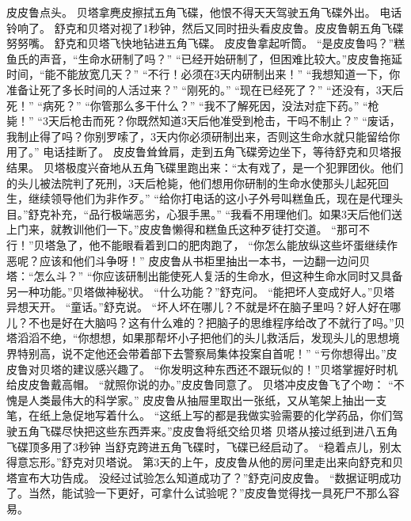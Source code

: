 \documentclass[a4paper,12pt,UTF8,twoside]{ctexbook}
\begin{document}
        皮皮鲁点头。 
        贝塔拿麂皮擦拭五角飞碟，他恨不得天天驾驶五角飞碟外出。 
        电话铃响了。 
        舒克和贝塔对视了1秒钟，然后又同时扭头看皮皮鲁。皮皮鲁朝五角飞碟努努嘴。 
        舒克和贝塔飞快地钻进五角飞碟。 
        皮皮鲁拿起听筒。 
        “是皮皮鲁吗？”糕鱼氏的声音，“生命水研制了吗？” 
        “已经开始研制了，但困难比较大。”皮皮鲁拖延时间，“能不能放宽几天？” 
        “不行！必须在3天内研制出来！” 
        “我想知道一下，你准备让死了多长时间的人活过来？” 
        “刚死的。” 
        “现在已经死了？” 
        “还没有，3天后死！” 
        “病死？” 
        “你管那么多干什么？” 
        “我不了解死因，没法对症下药。” 
        “枪毙！” 
        “3天后枪击而死？你既然知道3天后他准受到枪击，干吗不制止？” 
        “废话，我制止得了吗？你别罗嗦了，3天内你必须研制出来，否则这生命水就只能留给你用了。” 
        电话挂断了。 
        皮皮鲁耸耸肩，走到五角飞碟旁边坐下，等待舒克和贝塔报结果。 
        贝塔极度兴奋地从五角飞碟里跑出来：“太有戏了，是一个犯罪团伙。他们的头儿被法院判了死刑，3天后枪毙，他们想用你研制的生命水使那头儿起死回生，继续领导他们为非作歹。” 
        “给你打电话的这小子外号叫糕鱼氏，现在是代理头目。”舒克补充，“品行极端恶劣，心狠手黑。” 
        “我看不用理他们。如果3天后他们送上门来，就教训他们一下。”皮皮鲁懒得和糕鱼氏这种歹徒打交道。 
        “那可不行！”贝塔急了，他不能眼看着到口的肥肉跑了，  “你怎么能放纵这些坏蛋继续作恶呢？应该和他们斗争呀！” 
        皮皮鲁从书柜里抽出一本书，一边翻一边问贝塔：“怎么斗？” 
        “你应该研制出能使死人复活的生命水，但这种生命水同时又具备另一种功能。”贝塔做神秘状。 
        “什么功能？”舒克问。 
        “能把坏人变成好人。”贝塔异想天开。 
        “童话。”舒克说。 
        “坏人坏在哪儿？不就是坏在脑子里吗？好人好在哪儿？不也是好在大脑吗？这有什么难的？把脑子的思维程序给改了不就行了吗。”贝塔滔滔不绝，“你想想，如果那帮坏小子把他们的头儿救活后，发现头儿的思想境界特别高，说不定他还会带着部下去警察局集体投案自首呢！” 
        “亏你想得出。”皮皮鲁对贝塔的建议感兴趣了。 
        “你发明这种东西还不跟玩似的！”贝塔掌握好时机给皮皮鲁戴高帽。 
        “就照你说的办。”皮皮鲁同意了。 
        贝塔冲皮皮鲁飞了个吻： 
        “不愧是人类最伟大的科学家。” 
        皮皮鲁从抽屉里取出一张纸，又从笔架上抽出一支笔，在纸上急促地写着什么。 
        “这纸上写的都是我做实验需要的化学药品，你们驾驶五角飞碟尽快把这些东西弄来。”皮皮鲁将纸交给贝塔 
        贝塔从接过纸到进八五角飞碟顶多用了3秒钟 
        当舒克跨进五角飞碟时，飞碟已经启动了。 
        “稳着点儿，别太得意忘形。”舒克对贝塔说。 
        第3天的上午，皮皮鲁从他的房问里走出来向舒克和贝塔宣布大功告成。 
        没经过试验怎么知道成功了？”舒克问皮皮鲁。 
        “数据证明成功了。当然，能试验一下更好，可拿什么试验呢？”皮皮鲁觉得找一具死尸不那么容易。 
\end{document}
